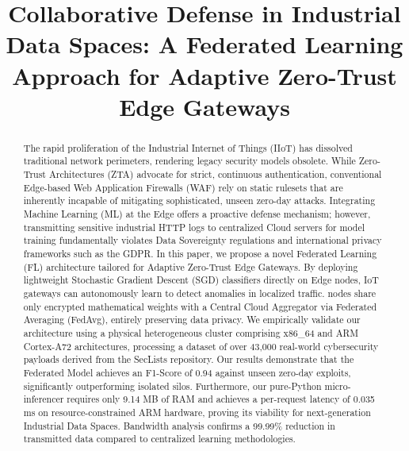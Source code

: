\documentclass[conference]{IEEEtran}
\begin{document}
\title{Collaborative Defense in Industrial Data Spaces: A Federated Learning Approach for Adaptive Zero-Trust Edge Gateways}

\author{
}

\maketitle

\begin{abstract}
The rapid proliferation of the Industrial Internet of Things (IIoT) has dissolved traditional network perimeters, rendering legacy security models obsolete. While Zero-Trust Architectures (ZTA) advocate for strict, continuous authentication, conventional Edge-based Web Application Firewalls (WAF) rely on static rulesets that are inherently incapable of mitigating sophisticated, unseen zero-day attacks. Integrating Machine Learning (ML) at the Edge offers a proactive defense mechanism; however, transmitting sensitive industrial HTTP logs to centralized Cloud servers for model training fundamentally violates Data Sovereignty regulations and international privacy frameworks such as the GDPR. In this paper, we propose a novel Federated Learning (FL) architecture tailored for Adaptive Zero-Trust Edge Gateways. By deploying lightweight Stochastic Gradient Descent (SGD) classifiers directly on Edge nodes, IoT gateways can autonomously learn to detect anomalies in localized traffic. nodes share only encrypted mathematical weights with a Central Cloud Aggregator via Federated Averaging (FedAvg), entirely preserving data privacy. We empirically validate our architecture using a physical heterogeneous cluster comprising x86\_64 and ARM Cortex-A72 architectures, processing a dataset of over 43,000 real-world cybersecurity payloads derived from the SecLists repository. Our results demonstrate that the Federated Model achieves an F1-Score of 0.94 against unseen zero-day exploits, significantly outperforming isolated silos. Furthermore, our pure-Python micro-inferencer requires only 9.14 MB of RAM and achieves a per-request latency of 0.035 ms on resource-constrained ARM hardware, proving its viability for next-generation Industrial Data Spaces. Bandwidth analysis confirms a 99.99\% reduction in transmitted data compared to centralized learning methodologies.
\end{abstract}
\end{document}

